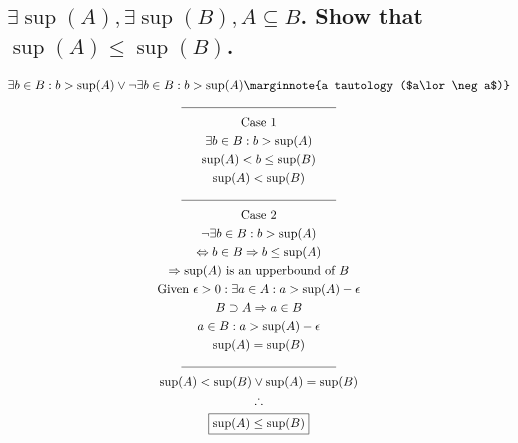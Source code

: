 \documentclass[letterpaper]{article}
\begin{document}
\subsection{$\exists\sup(A),\exists\sup(B),A\subseteq B$. Show that $\sup(A)\leq\sup(B)$.}
\begin{gather*}
\exists b\in B: b > \sup(A) \lor \neg \exists b\in B: b > \sup(A) \marginnote{a tautology ($a\lor\neg a$)} \\
\line(1, 0){125} \\
\text{Case 1} \\
\exists b\in B: b > \sup(A) \\
\sup(A) < b \leq \sup(B) \\
\sup(A) < \sup(B) \\
\line(1, 0){125} \\
\text{Case 2} \\
\neg \exists b\in B: b > \sup(A) \\
\Leftrightarrow b\in B\Rightarrow b\leq\sup(A) \\
\Rightarrow \text{$\sup(A)$ is an upperbound of $B$} \\
\text{Given }\epsilon>0: \exists a \in A: a>\sup(A)-\epsilon \\
B\supset A \Rightarrow a\in B \\
a \in B: a>\sup(A)-\epsilon \\
\sup(A) = \sup(B) \\
\line(1, 0){125} \\
\sup(A) < \sup(B) \lor \sup(A) = \sup(B) \\
\therefore \\
\boxed{\sup(A)\leq\sup(B)}
\end{gather*}
\end{document}
